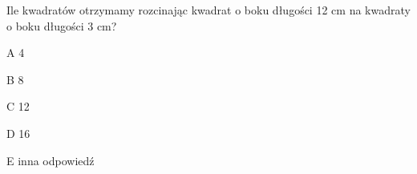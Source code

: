 \begin{tresc}
Ile kwadratów otrzymamy rozcinając kwadrat o boku długości 12 cm na kwadraty o boku długości 3 cm?
\end{tresc}
\begin{wariant}{A} 4 \end{wariant}
\begin{wariant}{B} 8 \end{wariant}
\begin{wariant}{C} 12 \end{wariant}
\begin{wariant}{D} 16 \end{wariant}
\begin{wariant}{E} inna odpowiedź \end{wariant}
